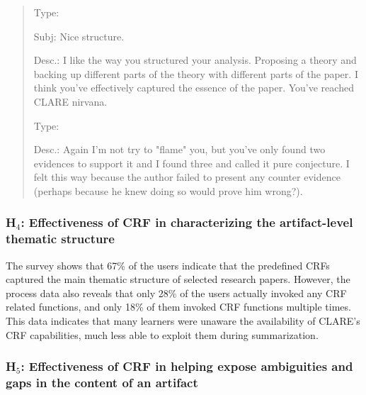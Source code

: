 \small
\begin{quote}
  \begin{itemizenoindent}

    \item {\sf Type}: 
 
    \item {\sf Subj}: Nice structure.
 
    \item {\sf Desc.}: I like the way you structured your analysis.
      Proposing a theory and backing up different parts of the theory
      with different parts of the paper.  I think you've effectively
      captured the essence of the paper.  You've reached CLARE nirvana.
  \end{itemizenoindent}
  
  \begin{itemizenoindent}
    \item {\sf Type}: 
 
    \item {\sf Desc.}: Again I'm not try to "flame" you, but you've
      only found two evidences to support it and I found three and
      called it pure conjecture.  I felt this way because the author
      failed to present any counter evidence (perhaps because he knew
      doing so would prove him wrong?).
  \end{itemizenoindent}
\end{quote}
\normalsize
{}


\subsubsection{H\(_4\): Effectiveness of CRF in characterizing the artifact-level
thematic structure}

The survey shows that 67\% of the users indicate that the predefined CRFs
captured the main thematic structure of selected research papers.  However,
the process data also reveals that only 28\% of the users actually invoked
any CRF related functions, and only 18\% of them invoked CRF functions
multiple times. This data indicates that many learners were unaware the
availability of CLARE's CRF capabilities, much less able to exploit them
during summarization.


\subsubsection{H\(_5\): Effectiveness of CRF in helping expose
ambiguities and gaps in the content of an artifact}

